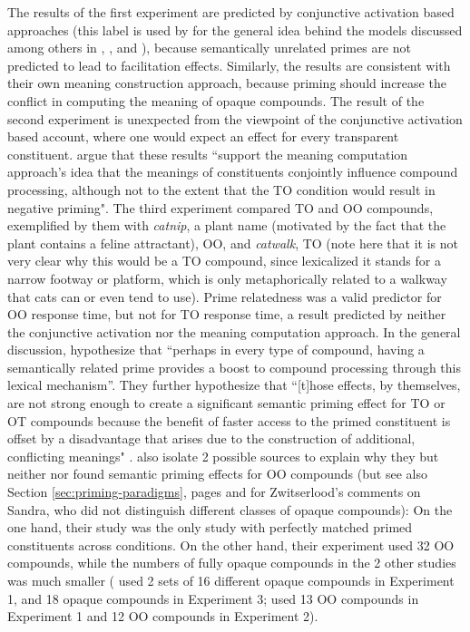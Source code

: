 The results of the first experiment are predicted by conjunctive
activation based approaches (this label is used by
\citealt{El-Bialy_etal:2013} for the general idea behind the models
discussed among others in \citealt{Sandra:1990},
\citealt{Zwitserlood:1994}, \citealt{SchreuderandBaayen:1995} and
\citealt{Libben:1998}), because semantically unrelated primes are not
predicted to lead to facilitation effects. Similarly, the results are
consistent with their own meaning construction approach, because
priming should increase the conflict in computing the meaning of
opaque compounds. The result of the second experiment is unexpected
from the viewpoint of the conjunctive activation based account, where
one would expect an effect for every transparent
constituent. \citet[86]{El-Bialy_etal:2013} argue that these results
``support the meaning computation approach's idea that the meanings of
constituents conjointly influence compound processing, although not to
the extent that the TO condition would result in negative priming".
The third experiment compared TO and OO compounds, exemplified by them
with \emph{catnip}, a plant name (motivated by the fact that the plant
contains a feline attractant), OO, and \emph{catwalk}, TO (note here
that it is not very clear why this would be a TO compound, since
lexicalized it stands for a narrow footway or platform, which is only
metaphorically related to a walkway that cats can or even tend to use).
Prime relatedness was a valid predictor for OO
response time, but not for TO response time, a result predicted by
neither the conjunctive activation nor the meaning computation
approach. In the general discussion, \citet[90]{El-Bialy_etal:2013} hypothesize that ``perhaps in
every type of compound, having a semantically related prime provides a
boost to compound processing through this lexical mechanism''. %
They further hypothesize that ``[t]hose
effects, by themselves, are not strong enough to create a significant
semantic priming effect for TO or OT compounds because the benefit of
faster access to the primed constituent is offset by a disadvantage
that arises due to the construction of additional, conflicting
meanings" \citeyearpar[90]{El-Bialy_etal:2013}. \citet[92]{El-Bialy_etal:2013} also isolate 2 possible
sources to explain why they but neither \citet{Sandra:1990} nor
\citet{Zwitserlood:1994} found semantic priming effects for OO
compounds (but see also Section \ref{sec:priming-paradigms}, pages \pageref{ZwitserloodOnSandraOO} and \pageref{ZwitserloodOnSandraOO-2} for Zwitserlood's comments on Sandra, who
did not distinguish different classes of opaque compounds): On the one
hand, their study was the only study with perfectly matched primed
constituents across conditions. On the other hand, their experiment
used 32 OO compounds, while the numbers of
fully opaque compounds in the 2 other studies was much smaller
(\citealt{Sandra:1990} used 2 sets of 16 different opaque
compounds in Experiment 1, and 18 opaque compounds in
Experiment 3; \citealt{Zwitserlood:1994} used 13 OO compounds in
Experiment 1 and 12 OO compounds in Experiment 2).

